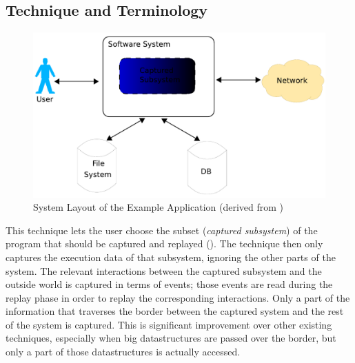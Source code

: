 \subsection{Technique and Terminology}
\begin{figure}[ht]
  \centering
  \includegraphics[width=1\textwidth]{illustrations/scr_overall_schema}
  \caption{System Layout of the Example Application (derived from \cite{orso05may})}
  \label{fig:scr_overall_schema}
\end{figure}
This technique lets the user choose the subset (\emph{captured subsystem}) of the program that should be captured and replayed (). The technique then only captures the execution data of that subsystem, ignoring the other parts of the system. The relevant interactions between the captured subsystem and the outside world is captured in terms of events; those events are read during the replay phase in order to replay the corresponding interactions. Only a part of the information that traverses the border between the captured system and the rest of the system is captured. This is significant improvement over other existing techniques, especially when big datastructures are passed over the border, but only a part of those datastructures is actually accessed.

